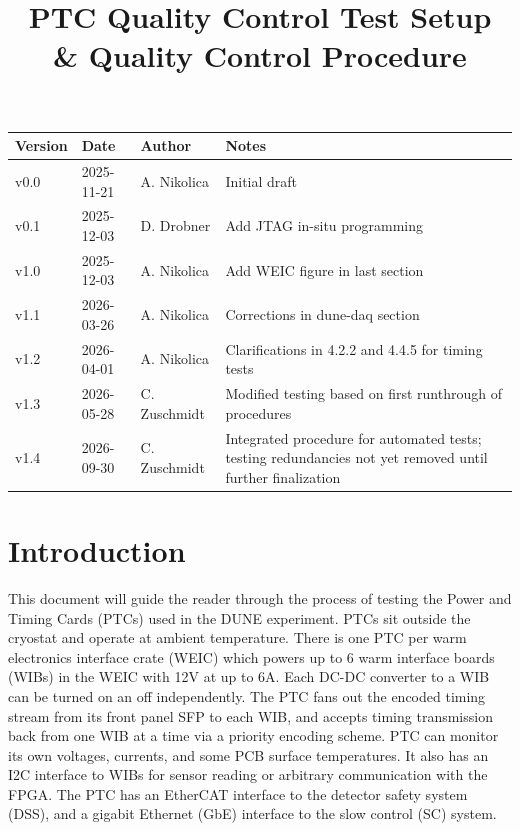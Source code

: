 \documentclass[a4paper,12pt]{article}
\title{\textbf{PTC Quality Control Test Setup \\ \& Quality Control Procedure}}
\author{}
\date{}
\begin{document}
\maketitle


\begin{center}
\renewcommand{\arraystretch}{1.2}  %
\begin{tabularx}{\textwidth}{|l|l|l|X|}
\hline
\textbf{Version} & \textbf{Date} & \textbf{Author} & \textbf{Notes} \\
\hline
v0.0 & 2025-11-21 & A. Nikolica & Initial draft \\
v0.1 & 2025-12-03 & D. Drobner & Add JTAG in-situ programming \\
v1.0 & 2025-12-03 & A. Nikolica & Add WEIC figure in last section \\
v1.1 & 2026-03-26 & A. Nikolica & Corrections in dune-daq section \\
v1.2 & 2026-04-01 & A. Nikolica & Clarifications in 4.2.2 and 4.4.5 for timing tests \\
v1.3 & 2026-05-28 & C. Zuschmidt & Modified testing based on first runthrough of procedures \\
v1.4 & 2026-09-30 & C. Zuschmidt & Integrated procedure for automated tests; testing redundancies not yet removed until further finalization \\
\hline

\end{tabularx}
\end{center}

\vspace{2em}  


\tableofcontents
\newpage

\section{Introduction}

This document will guide the reader through the process of testing the Power and Timing Cards (PTCs) used in the DUNE experiment. PTCs sit outside the cryostat and operate at ambient temperature. There is one PTC per warm electronics interface crate (WEIC) which powers up to 6 warm interface boards (WIBs) in the WEIC with 12V at up to 6A. Each DC-DC converter to a WIB can be turned on an off independently. The PTC fans out the encoded timing stream from its front panel SFP to each WIB, and accepts timing transmission back from one WIB at a time via a priority encoding scheme. PTC can monitor its own voltages, currents, and some PCB surface temperatures. It also has an I2C interface to WIBs for sensor reading or arbitrary communication with the FPGA. The PTC has an EtherCAT interface to the detector safety system (DSS), and a gigabit Ethernet (GbE) interface to the slow control (SC) system.  
\end{document}
